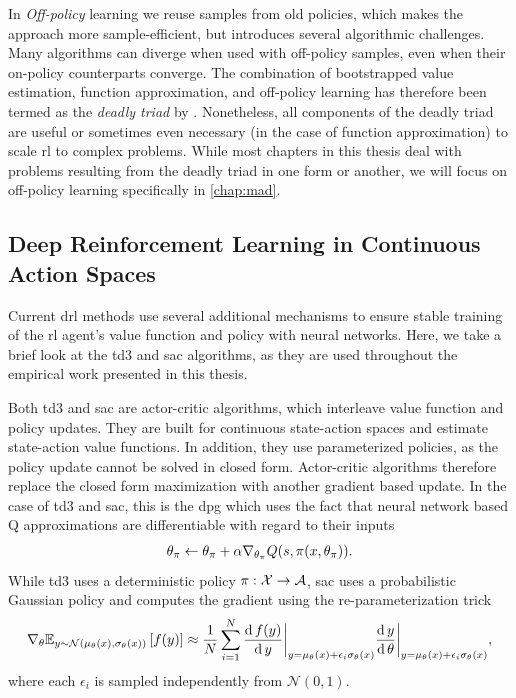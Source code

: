 In \emph{Off-policy} learning we reuse samples from old policies, which makes the approach more sample-efficient, but introduces several algorithmic challenges.
Many algorithms can diverge when used with off-policy samples, even when their on-policy counterparts converge.
The combination of bootstrapped value estimation, function approximation, and off-policy learning has therefore been termed as the \emph{deadly triad} by \textcite{suttonbook}.
Nonetheless, all components of the deadly triad are useful or sometimes even necessary (in the case of function approximation) to scale \ac{rl} to complex problems.
While most chapters in this thesis deal with problems resulting from the deadly triad in one form or another, we will focus on off-policy learning specifically in \autoref{chap:mad}.

\subsection{Deep Reinforcement Learning in Continuous Action Spaces}
\label{sec:background:drl}


Current \ac{drl} methods use several additional mechanisms to ensure stable training of the \ac{rl} agent's value function and policy with neural networks.
Here, we take a brief look at the \ac{td3} \parencite{td3} and \ac{sac} \parencite{sac} algorithms, as they are used throughout the empirical work presented in this thesis.

Both \ac{td3} and \ac{sac} are actor-critic algorithms, which interleave value function and policy updates.
They are built for continuous state-action spaces and estimate state-action value functions.
In addition, they use parameterized policies, as the policy update cannot be solved in closed form.
Actor-critic algorithms therefore replace the closed form maximization with another gradient based update.
In the case of \ac{td3} and \ac{sac}, this is the \ac{dpg} \parencite{silver2014deterministic} which uses the fact that neural network based Q approximations are differentiable with regard to their inputs
\begin{align}
    \theta_\pi \leftarrow \theta_\pi + \alpha \nabla_{\theta_\pi} Q(s, \pi(x, \theta_\pi)).
\end{align}
While \ac{td3} uses a deterministic policy $\pi: \mathcal{X} \rightarrow \mathcal{A}$, \ac{sac} uses a probabilistic Gaussian policy and computes the gradient using the re-parameterization trick
\begin{align}
    \nabla_{\theta} \mathbb{E}_{y \sim \mathcal{N}(\mu_\theta(x), \sigma_\theta(x))}\left[  f(y) \right] \approx \frac{1}{N} \sum_{i=1}^{N} \frac{\mathrm{d}\,f(y)}{\mathrm{d}\, y}\bigg|_{y = \mu_\theta(x) + \epsilon_i \sigma_\theta(x)}  \frac{\mathrm{d}\,y}{\mathrm{d}\,\theta}\bigg|_{y = \mu_\theta(x) + \epsilon_i \sigma_\theta(x)},
\end{align}
where each $\epsilon_i$ is sampled independently from $\mathcal{N}(0,1)$.


